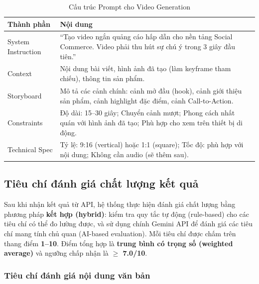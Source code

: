 \begin{table}[H]
\centering
\renewcommand{\arraystretch}{1.3}
\begin{tabularx}{\textwidth}{|l|X|}
\hline
\textbf{Thành phần} & \textbf{Nội dung} \\ \hline
System Instruction & ``Tạo video ngắn quảng cáo hấp dẫn cho nền tảng Social Commerce. Video phải thu hút sự chú ý trong 3 giây đầu tiên.'' \\ \hline
Context & Nội dung bài viết, hình ảnh đã tạo (làm keyframe tham chiếu), thông tin sản phẩm. \\ \hline
Storyboard & Mô tả các cảnh chính: cảnh mở đầu (hook), cảnh giới thiệu sản phẩm, cảnh highlight đặc điểm, cảnh Call-to-Action. \\ \hline
Constraints & Độ dài: 15--30 giây; Chuyển cảnh mượt; Phong cách nhất quán với hình ảnh đã tạo; Phù hợp cho xem trên thiết bị di động. \\ \hline
Technical Spec & Tỷ lệ: 9:16 (vertical) hoặc 1:1 (square); Tốc độ: phù hợp với nội dung; Không cần audio (sẽ thêm sau). \\ \hline
\end{tabularx}
\caption{Cấu trúc Prompt cho Video Generation}
\label{tab:prompt-video}
\end{table}

\subsection{Tiêu chí đánh giá chất lượng kết quả}

Sau khi nhận kết quả từ API, hệ thống thực hiện đánh giá chất lượng bằng phương pháp \textbf{kết hợp (hybrid)}: kiểm tra quy tắc tự động (rule-based) cho các tiêu chí có thể đo lường được, và sử dụng chính Gemini API để đánh giá các tiêu chí mang tính chủ quan (AI-based evaluation). Mỗi tiêu chí được chấm trên thang điểm \textbf{1--10}. Điểm tổng hợp là \textbf{trung bình có trọng số (weighted average)} và ngưỡng chấp nhận là \textbf{$\geq$ 7.0/10}.

\subsubsection{Tiêu chí đánh giá nội dung văn bản}

